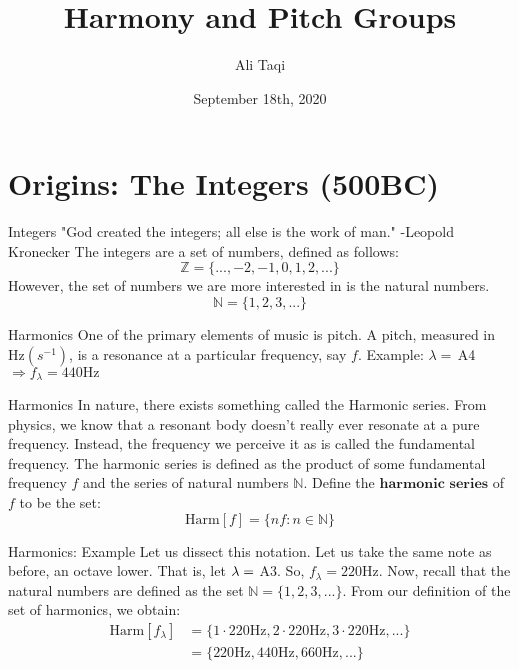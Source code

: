 \documentclass[usenames,dvipsnames]{beamer}
\title{Harmony and Pitch Groups}
\date{September 18th, 2020}
\author{Ali Taqi}
\institute{Reed Student Colloquium}
\newcommand{\N}{\mathbb{N}}
\newcommand{\Hz}{\text{Hz}}
\begin{document}
  \maketitle
  \section{Origins: The Integers (500BC)}

  \begin{frame}{Integers}
  "God created the integers; all else is the work of man." -Leopold Kronecker \newline
  The integers are a set of numbers, defined as follows: \newline
  $$\mathbb{Z} = \{...,-2,-1,0,1,2,...\}$$
  \newline
  However, the set of numbers we are more interested in is the natural numbers. \newline
  $$\mathbb{N} = \{1,2,3,...\}$$
  \end{frame}

  \begin{frame}{Harmonics}
One of the primary elements of music is pitch. A pitch, measured in $\Hz (s^{-1})$, is a resonance at a particular frequency, say $f$. \newline
  Example: $\lambda = \,$A4 $\Rightarrow f_\lambda = 440\Hz$ \newline
  \end{frame}
  
  \begin{frame}{Harmonics}
  In nature, there exists something called the Harmonic series. From physics, we know that a resonant body doesn't really ever resonate at a pure frequency. Instead, the frequency we perceive it as is called the fundamental frequency. 
  The harmonic series is defined as the product of some fundamental frequency $f$ and the series of natural numbers $\N$. Define the $\textbf{harmonic series}$ of $f$ to be the set:\newline 
  $$\text{Harm}[f] = \{nf : n \in \mathbb{N}\}$$
  \end{frame}
  
  \begin{frame}{Harmonics: Example}
      Let us dissect this notation. Let us take the same note as before, an octave lower. That is, let $\lambda = \space$ A3. So, $f_\lambda = 220\Hz$. Now, recall that the natural numbers are defined as the set $\mathbb{N} = \{1,2,3,...\}$. From our definition of the set of harmonics, we obtain:
  \begin{align*}
  \text{Harm}[f_\lambda] &= \{1\cdot220\Hz, 2\cdot220\Hz, 3\cdot220\Hz, ...\} \\
  &= \{220\Hz, 440\Hz, 660\Hz, ...\}
  \end{align*}
  \end{frame}
  
\end{document}
